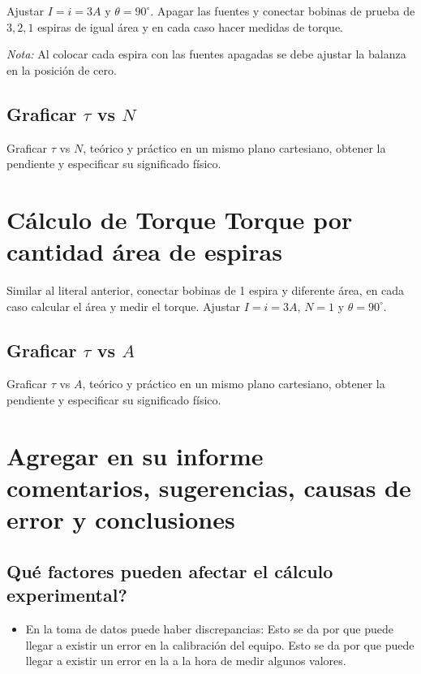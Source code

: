 Ajustar $I = i = 3A$ y $\theta = 90^{\circ}$. Apagar las fuentes y conectar
bobinas de prueba de $3, 2, 1$ espiras de igual área y en cada caso hacer
medidas de torque.

\textit{Nota:} Al colocar cada espira con las fuentes apagadas se debe ajustar
la balanza en la posición de cero.

\subsection{Graficar $\tau$ vs $N$}

Graficar $\tau$ vs $N$, teórico y práctico en un mismo plano cartesiano,
obtener la pendiente y especificar su significado físico.

\section{Cálculo de Torque Torque por cantidad área de espiras}

Similar al literal anterior, conectar bobinas de 1 espira y diferente área, en
cada caso calcular el área y medir el torque. Ajustar $I = i = 3A$, $N = 1$ y
$\theta = 90^{\circ}$.


\subsection{Graficar $\tau$ vs $A$}

Graficar $\tau$ vs $A$, teórico y práctico en un mismo plano cartesiano,
obtener la pendiente y especificar su significado físico.


\section{Agregar en su informe comentarios, sugerencias, causas de error y
  conclusiones}

\subsection{Qué factores pueden afectar el cálculo experimental?}

\begin{itemize}
    \item En la toma de datos puede haber discrepancias:
          \subitem Esto se da por que puede llegar a existir un error en la
          calibración del equipo.
          \subitem Esto se da por que puede llegar a existir un error en la
          a la hora de medir algunos valores.
\end{itemize}


